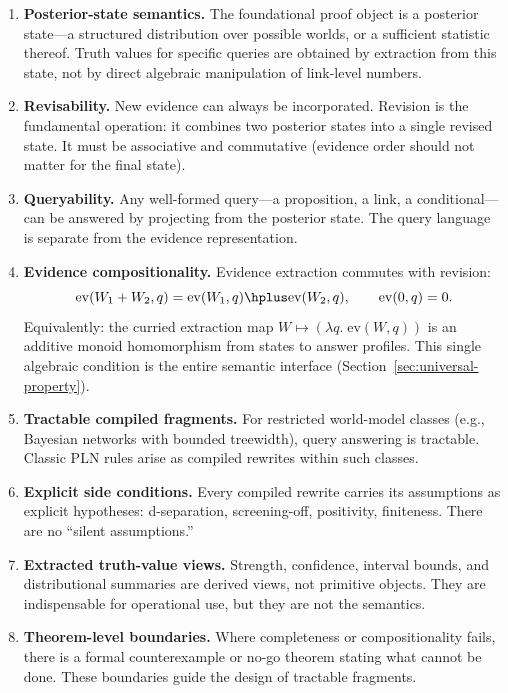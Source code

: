 \documentclass[11pt,openany]{report}
\begin{document}
\begin{enumerate}
\item \textbf{Posterior-state semantics.}  The foundational proof object is a
  posterior state---a structured distribution over possible worlds, or a
  sufficient statistic thereof.  Truth values for specific queries are
  obtained by extraction from this state, not by direct algebraic manipulation
  of link-level numbers.

\item \textbf{Revisability.}  New evidence can always be incorporated.
  Revision is the fundamental operation: it combines two posterior states
  into a single revised state.  It must be associative and commutative
  (evidence order should not matter for the final state).

\item \textbf{Queryability.}  Any well-formed query---a proposition, a link,
  a conditional---can be answered by projecting from the posterior state.
  The query language is separate from the evidence representation.

\item \textbf{Evidence compositionality.}  Evidence extraction commutes with
  revision:
  \[
    \mathrm{ev}(W_1 + W_2, q) = \mathrm{ev}(W_1, q) \hplus
    \mathrm{ev}(W_2, q), \qquad \mathrm{ev}(0, q) = 0.
  \]
  Equivalently: the curried extraction map
  $W \mapsto (\lambda q.\;\mathrm{ev}(W,q))$ is an additive monoid
  homomorphism from states to answer profiles.  This single algebraic
  condition is the entire semantic interface
  (Section~\ref{sec:universal-property}).

\item \textbf{Tractable compiled fragments.}  For restricted world-model
  classes (e.g., Bayesian networks with bounded treewidth), query answering
  is tractable.  Classic PLN rules arise as compiled rewrites within such
  classes.

\item \textbf{Explicit side conditions.}  Every compiled rewrite carries its
  assumptions as explicit hypotheses: d-separation, screening-off, positivity,
  finiteness.  There are no ``silent assumptions.''

\item \textbf{Extracted truth-value views.}  Strength, confidence, interval
  bounds, and distributional summaries are derived views, not primitive
  objects.  They are indispensable for operational use, but they are not the
  semantics.

\item \textbf{Theorem-level boundaries.}  Where completeness or compositionality
  fails, there is a formal counterexample or no-go theorem stating what
  cannot be done.  These boundaries guide the design of tractable fragments.
\end{enumerate}
\end{document}
